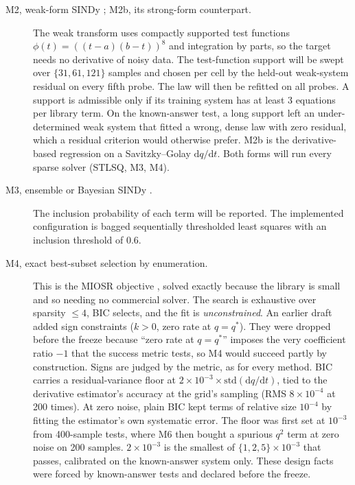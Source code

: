 \documentclass[11pt]{article}
\newcommand{\qs}{q^{*}}
\begin{document}
\begin{description}
\item[M2, weak-form SINDy \citep{messenger2021ode,messenger2021pde}; M2b, its strong-form
counterpart.] The weak transform uses compactly supported test functions $\phi(t) =
((t-a)(b-t))^{8}$ and integration by parts, so the target needs no derivative of noisy
data. The test-function support will be swept over $\{31, 61, 121\}$ samples and chosen
per cell by the held-out weak-system residual on every fifth probe. The law will then be
refitted on all probes. A support is admissible only if its training system has at least
3 equations per library term. On the known-answer test, a long support left an
under-determined weak system that fitted a wrong, dense law with zero residual, which a
residual criterion would otherwise prefer. M2b is the derivative-based regression on a
Savitzky--Golay $\mathrm{d}q/\mathrm{d}t$. Both forms will run every sparse solver (STLSQ,
M3, M4).

\item[M3, ensemble or Bayesian SINDy \citep{fasel2022,hirsh2021}.] The inclusion
probability of each term will be reported. The implemented configuration is bagged
sequentially thresholded least squares with an inclusion threshold of 0.6.

\item[M4, exact best-subset selection by enumeration.] This is the MIOSR objective
\citep{bertsimas2022}, solved exactly because the library is small and so needing no
commercial solver. The search is exhaustive over sparsity $\le 4$, BIC selects, and the
fit is \emph{unconstrained}. An earlier draft added sign constraints ($k > 0$, zero rate at
$q = \qs$). They were dropped before the freeze because ``zero rate at $q = \qs$''
imposes the very coefficient ratio $-1$ that the success metric tests, so M4 would
succeed partly by construction. Signs are judged by the metric, as for every method. BIC
carries a residual-variance floor at $2\times10^{-3}\times\mathrm{std}(\mathrm{d}q/
\mathrm{d}t)$, tied to the derivative estimator's accuracy at the grid's sampling (RMS
$8\times10^{-4}$ at 200 times). At zero noise, plain BIC kept terms of relative size
$10^{-4}$ by fitting the estimator's own systematic error. The floor was first set at
$10^{-3}$ from 400-sample tests, where M6 then bought a spurious $q^{2}$ term at zero noise
on 200 samples. $2\times10^{-3}$ is the smallest of $\{1,2,5\}\times10^{-3}$ that passes,
calibrated on the known-answer system only. These design facts were forced by
known-answer tests and declared before the freeze.


\end{description}
\end{document}
